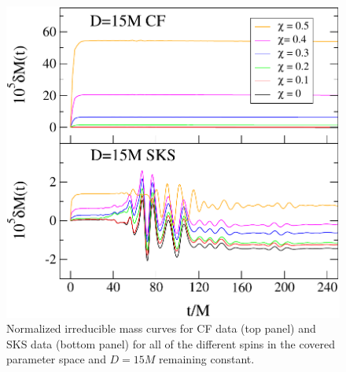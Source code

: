 \begin{figure}[!htb]
 \includegraphics[width=0.95\columnwidth]{chap5/MassIncreaseCFSKS}
  \caption[Normalized irreducible mass curves for CF and SKS data.]{Normalized irreducible mass curves for CF data (top panel)
    and SKS data (bottom panel) for all of the different spins in the
    covered parameter space and $D=15M$ remaining constant. }
  \label{fig:MassIncreaseCFSKS}
\end{figure}

